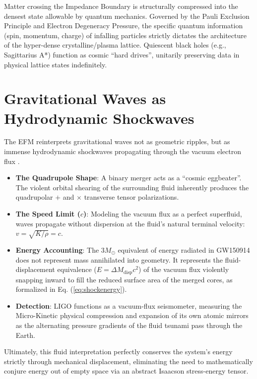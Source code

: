 \documentclass[11pt, a4paper]{article}
\begin{document}
Matter crossing the Impedance Boundary is structurally compressed into the densest state allowable by quantum mechanics. Governed by the Pauli Exclusion Principle and Electron Degeneracy Pressure, the specific quantum information (spin, momentum, charge) of infalling particles strictly dictates the architecture of the hyper-dense crystalline/plasma lattice. Quiescent black holes (e.g., Sagittarius A*) function as cosmic ``hard drives'', unitarily preserving data in physical lattice states indefinitely.

\section{Gravitational Waves as Hydrodynamic Shockwaves}
The EFM reinterprets gravitational waves not as geometric ripples, but as immense hydrodynamic shockwaves propagating through the vacuum electron flux \cite{ligo2016}.
\begin{itemize}
  \item \textbf{The Quadrupole Shape}: A binary merger acts as a ``cosmic eggbeater''. The violent orbital shearing of the surrounding fluid inherently produces the quadrupolar $+$ and $\times$ transverse tensor polarizations.
  \item \textbf{The Speed Limit ($c$)}: Modeling the vacuum flux as a perfect superfluid, waves propagate without dispersion at the fluid's natural terminal velocity: $v = \sqrt{K/\rho} = c$.
  \item \textbf{Energy Accounting}: The $3 M_\odot$ equivalent of energy radiated in GW150914 does not represent mass annihilated into geometry. It represents the fluid-displacement equivalence ($E = \Delta M_{\text{disp}} c^2$) of the vacuum flux violently snapping inward to fill the reduced surface area of the merged cores, as formalized in Eq. (\ref{eq:shockenergy}).
  \item \textbf{Detection}: LIGO functions as a vacuum-flux seismometer, measuring the Micro-Kinetic physical compression and expansion of its own atomic mirrors as the alternating pressure gradients of the fluid tsunami pass through the Earth.
\end{itemize}
Ultimately, this fluid interpretation perfectly conserves the system's energy strictly through mechanical displacement, eliminating the need to mathematically conjure energy out of empty space via an abstract Isaacson stress-energy tensor.
\end{document}
